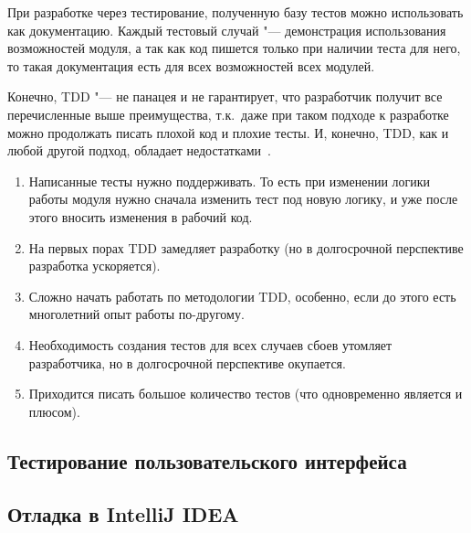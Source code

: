 При разработке через тестирование, полученную базу тестов можно использовать как документацию.
Каждый тестовый случай "--- демонстрация использования возможностей модуля, а так как код пишется только при наличии теста для него, то такая документация есть для всех возможностей всех модулей.

Конечно, TDD "--- не панацея и не гарантирует, что разработчик получит все перечисленные выше преимущества, т.к.\ даже при таком подходе к разработке можно продолжать писать плохой код и плохие тесты.
И, конечно, TDD, как и любой другой подход, обладает недостатками~\cite{tdd}.

\begin{enumerate}
  \item Написанные тесты нужно поддерживать.
То есть при изменении логики работы модуля нужно сначала изменить тест под новую логику, и уже после этого вносить изменения в рабочий код.
  \item На первых порах TDD замедляет разработку (но в долгосрочной перспективе разработка ускоряется).
  \item Сложно начать работать по методологии TDD, особенно, если до этого есть многолетний опыт работы по-другому.
  \item Необходимость создания тестов для всех случаев сбоев утомляет разработчика, но в долгосрочной перспективе окупается.
  \item Приходится писать большое количество тестов (что одновременно является и плюсом).
\end{enumerate}

\subsection{Тестирование пользовательского интерфейса}
\label{subsec:testing:ui}

\subsection{Отладка в IntelliJ IDEA}
\label{subsec:debug}

\conclusions
\label{sec:techConclusions}
